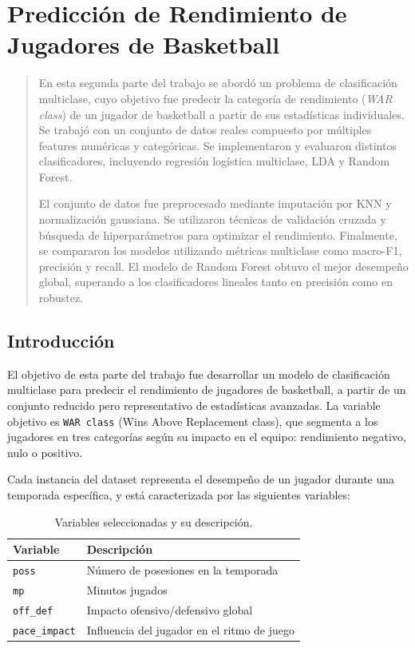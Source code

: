 \documentclass[11pt]{article}
\begin{document}
\section{Predicción de Rendimiento de Jugadores de Basketball}
\begin{abstract}
En esta segunda parte del trabajo se abordó un problema de clasificación multiclase, cuyo objetivo fue predecir la categoría de rendimiento (\textit{WAR class}) de un jugador de basketball a partir de sus estadísticas individuales. Se trabajó con un conjunto de datos reales compuesto por múltiples features numéricas y categóricas. Se implementaron y evaluaron distintos clasificadores, incluyendo regresión logística multiclase, LDA y Random Forest.

El conjunto de datos fue preprocesado mediante imputación por KNN y normalización gaussiana. Se utilizaron técnicas de validación cruzada y búsqueda de hiperparámetros para optimizar el rendimiento. Finalmente, se compararon los modelos utilizando métricas multiclase como macro-F1, precisión y recall. El modelo de Random Forest obtuvo el mejor desempeño global, superando a los clasificadores lineales tanto en precisión como en robustez.
\end{abstract}


\subsection{Introducción}

El objetivo de esta parte del trabajo fue desarrollar un modelo de clasificación multiclase para predecir el rendimiento de jugadores de basketball, a partir de un conjunto reducido pero representativo de estadísticas avanzadas. La variable objetivo es \texttt{WAR class} (Wins Above Replacement class), que segmenta a los jugadores en tres categorías según su impacto en el equipo: rendimiento negativo, nulo o positivo.

Cada instancia del dataset representa el desempeño de un jugador durante una temporada específica, y está caracterizada por las siguientes variables:

\vspace{0.5em}
\begin{table}[h]
\centering
\label{tab:variables_seleccionadas}
\begin{tabular}{ll}
\toprule
\textbf{Variable} & \textbf{Descripción} \\
\midrule
\texttt{poss} & Número de posesiones en la temporada \\
\texttt{mp} & Minutos jugados \\
\texttt{off\_def} & Impacto ofensivo/defensivo global \\
\texttt{pace\_impact} & Influencia del jugador en el ritmo de juego \\
\bottomrule
\end{tabular}
\caption{Variables seleccionadas y su descripción.}
\end{table}
\end{document}

